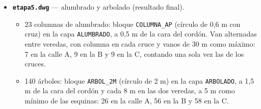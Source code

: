 \documentclass[12pt, a4paper]{article}
\begin{document}
\begin{itemize}[itemsep=8pt]
  \item \textbf{\texttt{etapa5.dwg}} --- alumbrado y arbolado (resultado final).
  \begin{itemize}[itemsep=2pt]
    \item 23 columnas de alumbrado: bloque \texttt{COLUMNA\_AP} (círculo de 0,6 m con cruz)
    en la capa \texttt{ALUMBRADO}, a 0,5 m de la cara del cordón. Van alternadas entre
    veredas, con columna en cada cruce y vanos de 30 m como máximo: 7 en la calle A, 9 en la
    B y 9 en la C, contando una sola vez las de los cruces.
    \item 140 árboles: bloque \texttt{ARBOL\_2M} (círculo de 2 m) en la capa
    \texttt{ARBOLADO}, a 1,5 m de la cara del cordón y cada 8 m en las dos veredas, a 5 m
    como mínimo de las esquinas: 26 en la calle A, 56 en la B y 58 en la C.
  \end{itemize}
\end{itemize}
\end{document}
